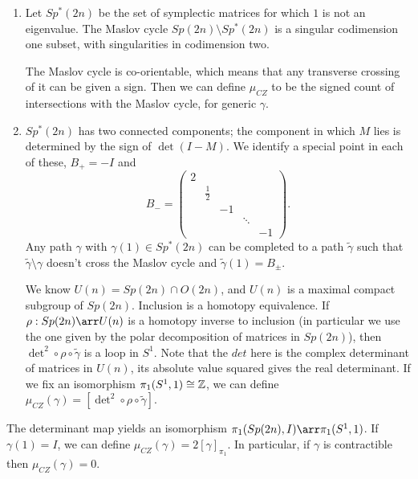 \begin{enumerate}[(1)]
\item Let $Sp^*(2n)$ be the set of symplectic matrices for which $1$ is not an eigenvalue. The Maslov cycle $Sp(2n) \setminus Sp^*(2n)$ is a singular codimension one subset, with singularities in codimension two.
\begin{center}
\end{center}
The Maslov cycle is co-orientable, which means that any transverse crossing of it can be given a sign. Then we can define $\mu_{CZ}$ to be the signed count of intersections with the Maslov cycle, for generic $\gamma$.

\item $Sp^*(2n)$ has two connected components; the component in which $M$ lies is determined by the sign of $\det(I-M)$. We identify a special point in each of these, $B_+=-I$ and
\[
B_- = \begin{pmatrix}
2
\\
& \tfrac12
\\
&& -1
\\
&&& \ddots
\\
&&&& -1
\end{pmatrix}.
\]
Any path $\gamma$ with $\gamma(1) \in Sp^*(2n)$ can be completed to a path $\tilde{\gamma}$ such that $\tilde{\gamma} \setminus \gamma$ doesn't cross the Maslov cycle and $\tilde{\gamma}(1) = B_\pm$.

We know $U(n)=Sp(2n) \cap O(2n)$, and $U(n)$ is a maximal compact subgroup of $Sp(2n)$. Inclusion is a homotopy equivalence. If $\rho:Sp(2n) \arr U(n)$ is a homotopy inverse to inclusion (in particular we use the one given by the polar decomposition of matrices in $Sp(2n)$), then $\det^2 \circ \rho \circ \tilde{\gamma}$ is a loop in $S^1$. Note that the $det$ here is the complex determinant of matrices in $U(n)$, its absolute value squared gives the real determinant. If we fix an isomorphism $\pi_1(S^1,1) \cong \mathbb{Z}$, we can define $\mu_{CZ}(\gamma) = [\det^2 \circ \rho \circ \tilde{\gamma}]$.
\end{enumerate}

The determinant map yields an isomorphism $\pi_1(Sp(2n),I) \arr \pi_1(S^1,1)$. If $\gamma(1)=I$, we can define $\mu_{CZ}(\gamma)=2[\gamma]_{\pi_1}$. In particular, if $\gamma$ is contractible then $\mu_{CZ}(\gamma)=0$.